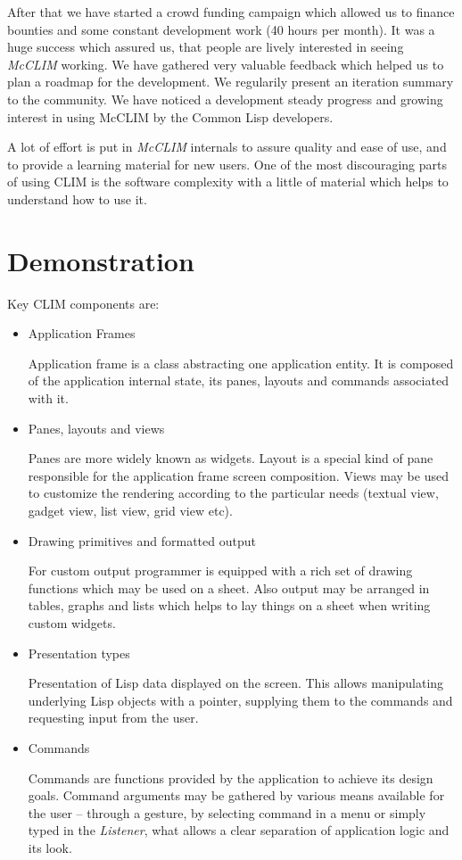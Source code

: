 \documentclass{sig-alternate-05-2015}
\begin{document}
After that we have started a crowd funding campaign which allowed us
to finance bounties and some constant development work (40 hours per
month). It was a huge success which assured us, that people are lively
interested in seeing \emph{McCLIM} working. We have gathered very
valuable feedback which helped us to plan a roadmap\cite{roadmap} for
the development. We regularily present an iteration summary to the
community. We have noticed a development steady progress and growing
interest in using McCLIM by the Common Lisp developers.


A lot of effort is put in \emph{McCLIM} internals to assure quality
and ease of use, and to provide a learning material for new users. One
of the most discouraging parts of using CLIM is the software
complexity with a little of material which helps to understand how to
use it.
\section{Demonstration}

Key CLIM components are:

\begin{itemize}
\item Application Frames

  Application frame is a class abstracting one application entity. It
  is composed of the application internal state, its panes, layouts
  and commands associated with it.

\item Panes, layouts and views

  Panes are more widely known as widgets. Layout is a special kind of
  pane responsible for the application frame screen composition. Views
  may be used to customize the rendering according to the particular
  needs (textual view, gadget view, list view, grid view etc).

\item Drawing primitives and formatted output

  For custom output programmer is equipped with a rich set of drawing
  functions which may be used on a sheet. Also output may be arranged
  in tables, graphs and lists which helps to lay things on a sheet
  when writing custom widgets.

\item Presentation types

  Presentation of Lisp data displayed on the screen. This allows
  manipulating underlying Lisp objects with a pointer, supplying them
  to the commands and requesting input from the user.

\item Commands

  Commands are functions provided by the application to achieve its
  design goals. Command arguments may be gathered by various means
  available for the user – through a gesture, by selecting command in
  a menu or simply typed in the \emph{Listener}\cite{listener}, what
  allows a clear separation of application logic and its look.
\end{itemize}
\end{document}

